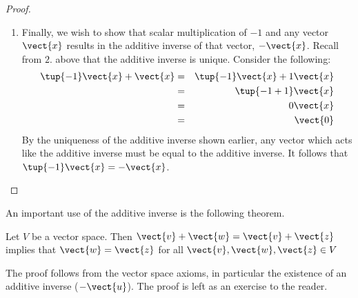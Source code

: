 \begin{proof}
\begin{enumerate}
\item
Finally, we wish to show that scalar multiplication of $-1$ and any vector $\vect{x}$ results in the additive inverse of that vector, $-\vect{x}$. Recall from $2.$ above that the additive inverse is unique. 
Consider the following: 
\begin{eqnarray*}
\tup{-1} \vect{x}+\vect{x} & =&\tup{-1} \vect{x}+1\vect{x}\\
&=&\tup{-1+1} \vect{x} \\
&=&0\vect{x} \\
&=&\vect{0}
\end{eqnarray*}
By the uniqueness of the additive inverse shown earlier, any vector which acts like the additive inverse must be equal to the additive inverse. It follows that $\tup{-1} 
\vect{x}=-\vect{x}$.
\end{enumerate}
\end{proof}

An important use of the additive inverse is the following theorem.

\begin{theorem}{}{}
Let $V$ be a vector space. Then $\vect{v} + \vect{w} = \vect{v} + \vect{z}$ implies that $\vect{w} = \vect{z}$ for all $\vect{v}, \vect{w}, \vect{z} \in V$
\end{theorem}

The proof follows from the vector space axioms, in particular the existence of an additive inverse ($-\vect{u}$). The proof is left as an exercise to the reader. 
